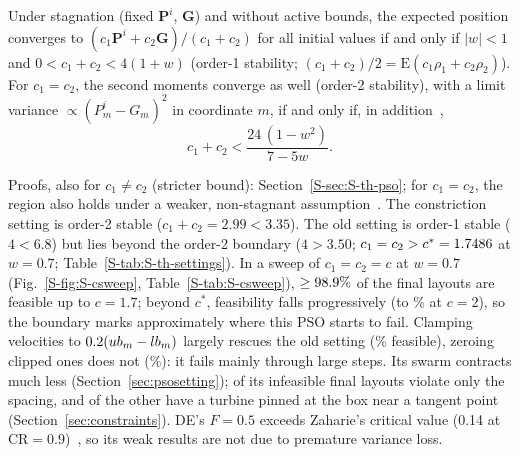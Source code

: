 \begin{proposition}\label{prop:pso-stability}
Under stagnation (fixed $\mathbf P^i$, $\mathbf G$) and without active bounds, the expected position converges to $(c_1\mathbf P^i+c_2\mathbf G)/(c_1+c_2)$ for all initial values if and only if $\lvert w\rvert<1$ and $0<c_1+c_2<4(1+w)$ (order-1 stability; $(c_1+c_2)/2=\mathrm E(c_1\rho_1+c_2\rho_2)$). For $c_1=c_2$, the second moments converge as well (order-2 stability), with a limit variance $\propto(P^i_m-G_m)^2$ in coordinate $m$, if and only if, in addition~\cite{Poli2009},
\begin{equation}
c_1+c_2<\frac{24\,(1-w^2)}{7-5w}.
\label{eq:poli}
\end{equation}
\end{proposition}
Proofs, also for $c_1\ne c_2$ (stricter bound): Section~\ref{S-sec:S-th-pso}; for $c_1=c_2$, the region also holds under a weaker, non-stagnant assumption~\cite{Cleghorn2018}. The constriction setting is order-2 stable ($c_1+c_2=2.99<3.35$). The old setting is order-1 stable ($4<6.8$) but lies beyond the order-2 boundary ($4>3.50$; $c_1=c_2>c^*=1.7486$ at $w=0.7$; Table~\ref{S-tab:S-th-settings}). In a sweep of $c_1=c_2=c$ at $w=0.7$ (Fig.~\ref{S-fig:S-csweep}, Table~\ref{S-tab:S-csweep}), $\ge98.9\%$ of the final layouts are feasible up to $c=1.7$; beyond $c^*$, feasibility falls progressively (to \NSFeasCTwoZero\% at $c=2$), so the boundary marks approximately where this PSO starts to fail. Clamping velocities to $0.2(ub_m-lb_m)$ largely rescues the old setting (\NSFeasVMax\% feasible), zeroing clipped ones does not (\NSFeasVZero\%): it fails mainly through large steps. Its swarm contracts much less (Section~\ref{sec:psosetting}); \NDStoredSpacingOnlyOld{} of its \NDStoredInfeasOld{} infeasible final layouts violate only the spacing, and \NDStoredTangentOld{} of the other \NDStoredAnyBoundOld{} have a turbine pinned at the box near a tangent point (Section~\ref{sec:constraints}). DE's $F=0.5$ exceeds Zaharie's critical value (0.14 at $\mathrm{CR}=0.9$)~\cite{Zaharie2002}, so its weak results are not due to premature variance loss.
